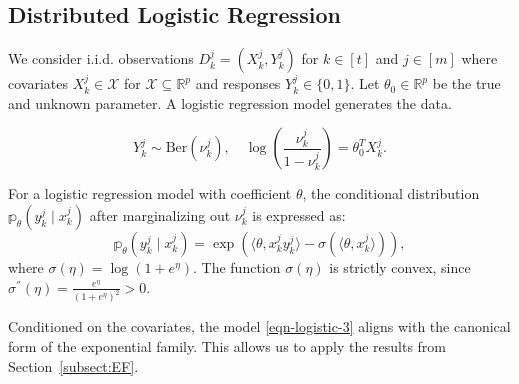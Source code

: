 \documentclass[twoside,11pt]{article}
\numberwithin{equation}{section}
\newcommand{\R}{{\mathbb{R}}}
\newcommand\bp{\mathbb{p}}
\newcommand{\X}{\mathcal{X}}
\begin{document}
{\subsection{Distributed Logistic Regression} \label{subsect:logistic}
We consider i.i.d. observations $D_k^j = (X_k^j, Y_k^j)$ for $k \in [t] $ and $j \in [m]$ where covariates $X_k^j \in \X$ for $\X \subseteq \R^p$ and responses $Y_k^j \in \{0, 1\}$. Let $\theta_0 \in \R^p$ be the true and unknown parameter. A logistic regression model generates the data.  

\begin{equation}\label{eqn-logistic-1}
    Y_k^j \sim \text{Ber}(\nu_k^j), \quad \log \left( \frac{\nu_k^j}{1 - \nu_k^j} \right) = \theta_0^T X_k^j. 
\end{equation}


For a logistic regression model with coefficient $\theta$, the conditional distribution $\bp_\theta(y_k^j \mid x_k^j)$ after marginalizing out $\nu_k^j$ is expressed as:
\begin{equation}\label{eqn-logistic-3}
        \bp_\theta(y_k^j \mid x_k^j) = \exp\left(\langle \theta, x_k^j y_k^j \rangle - \sigma(\langle \theta, x_k^j \rangle)\right),
\end{equation}
where $\sigma(\eta) = \log(1 + e^\eta)$. The function $\sigma(\eta)$ is strictly convex, since $\sigma^{''}(\eta) = \frac{e^\eta}{(1 + e^\eta)^2} > 0$.  

Conditioned on the covariates, the model \eqref{eqn-logistic-3} aligns with the canonical form of the exponential family. This allows us to apply the results from Section~\ref{subsect:EF}.

}
\end{document}
